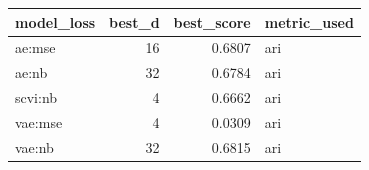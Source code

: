 \begin{tabular}{lrrl}
\toprule
model\_loss & best\_d & best\_score & metric\_used \\
\midrule
ae:mse & 16 & 0.6807 & ari \\
ae:nb & 32 & 0.6784 & ari \\
scvi:nb & 4 & 0.6662 & ari \\
vae:mse & 4 & 0.0309 & ari \\
vae:nb & 32 & 0.6815 & ari \\
\bottomrule
\end{tabular}
